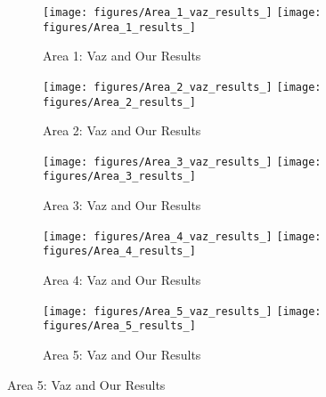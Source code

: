 \begin{figure}
	\centering
	\begin{subfigure}{\textwidth}
		\centering
		\texttt{[image: figures/Area\_1\_vaz\_results\_]}
		\texttt{[image: figures/Area\_1\_results\_]}
		\caption{ Area 1: Vaz \cite{vaz_object_based_dune_analysis} and Our Results }
		\label{fig:mixed_ml_grad_area1_results}
	\end{subfigure}
	\begin{subfigure}{\textwidth}
		\centering
		\texttt{[image: figures/Area\_2\_vaz\_results\_]}
		\texttt{[image: figures/Area\_2\_results\_]}
		\caption{ Area 2: Vaz \cite{vaz_object_based_dune_analysis} and Our Results }
		\label{fig:mixed_ml_grad_area2_results}
	\end{subfigure}
	\begin{subfigure}{\textwidth}
		\centering
		\texttt{[image: figures/Area\_3\_vaz\_results\_]}
		\texttt{[image: figures/Area\_3\_results\_]}
		\caption{ Area 3: Vaz \cite{vaz_object_based_dune_analysis} and Our Results }
		\label{fig:mixed_ml_grad_area3_results}
	\end{subfigure}
	\begin{subfigure}{\textwidth}
		\centering
		\texttt{[image: figures/Area\_4\_vaz\_results\_]}
		\texttt{[image: figures/Area\_4\_results\_]}
		\caption{ Area 4: Vaz \cite{vaz_object_based_dune_analysis} and Our Results }
		\label{fig:mixed_ml_grad_area4_results}
	\end{subfigure}
	\begin{subfigure}{\textwidth}
		\centering
		\texttt{[image: figures/Area\_5\_vaz\_results\_]}
		\texttt{[image: figures/Area\_5\_results\_]}
		\caption{ Area 5: Vaz \cite{vaz_object_based_dune_analysis} and Our Results }
		\label{fig:mixed_ml_grad_area5_results}
	\end{subfigure}
\end{figure}
